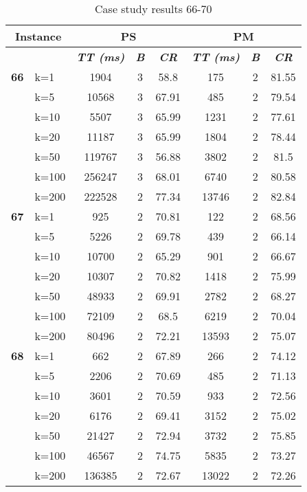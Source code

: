     \begin{table}[htbp]
    \caption{Case study results 66-70}
    \centering
    \begin{tabular}{|l|l|c|c|c|c|c|c|}
    \hline
    \multicolumn{ 2}{|c|}{\textbf{Instance}} & \multicolumn{ 3}{c|}{\textbf{PS}} & \multicolumn{ 3}{c|}{\textbf{PM}} \\ \hline
    \multicolumn{ 2}{|l|}{} & \textbf{\textit{TT (ms)}} & \textbf{\textit{B}} & \textbf{\textit{CR}} & \textbf{\textit{TT (ms)}} & \textbf{\textit{B}} & \textbf{\textit{CR}} \\ \hline
    \multicolumn{1}{|r|}{\textbf{66}} & k=1 & 1904 & 3 & 58.8 & 175 & 2 & 81.55 \\ 
     & k=5 & 10568 & 3 & 67.91 & 485 & 2 & 79.54 \\ 
     & k=10 & 5507 & 3 & 65.99 & 1231 & 2 & 77.61 \\ 
     & k=20 & 11187 & 3 & 65.99 & 1804 & 2 & 78.44 \\ 
     & k=50 & 119767 & 3 & 56.88 & 3802 & 2 & 81.5 \\ 
     & k=100 & 256247 & 3 & 68.01 & 6740 & 2 & 80.58 \\ 
     & k=200 & 222528 & 2 & 77.34 & 13746 & 2 & 82.84 \\ \hline
    \multicolumn{1}{|r|}{\textbf{67}} & k=1 & 925 & 2 & 70.81 & 122 & 2 & 68.56 \\ 
     & k=5 & 5226 & 2 & 69.78 & 439 & 2 & 66.14 \\ 
     & k=10 & 10700 & 2 & 65.29 & 901 & 2 & 66.67 \\ 
     & k=20 & 10307 & 2 & 70.82 & 1418 & 2 & 75.99 \\ 
     & k=50 & 48933 & 2 & 69.91 & 2782 & 2 & 68.27 \\ 
     & k=100 & 72109 & 2 & 68.5 & 6219 & 2 & 70.04 \\ 
     & k=200 & 80496 & 2 & 72.21 & 13593 & 2 & 75.07 \\ \hline
    \multicolumn{1}{|r|}{\textbf{68}} & k=1 & 662 & 2 & 67.89 & 266 & 2 & 74.12 \\ 
     & k=5 & 2206 & 2 & 70.69 & 485 & 2 & 71.13 \\ 
     & k=10 & 3601 & 2 & 70.59 & 933 & 2 & 72.56 \\ 
     & k=20 & 6176 & 2 & 69.41 & 3152 & 2 & 75.02 \\ 
     & k=50 & 21427 & 2 & 72.94 & 3732 & 2 & 75.85 \\ 
     & k=100 & 46567 & 2 & 74.75 & 5835 & 2 & 73.27 \\ 
     & k=200 & 136385 & 2 & 72.67 & 13022 & 2 & 72.26 \\ \hline

\end{tabular}
\end{table}
